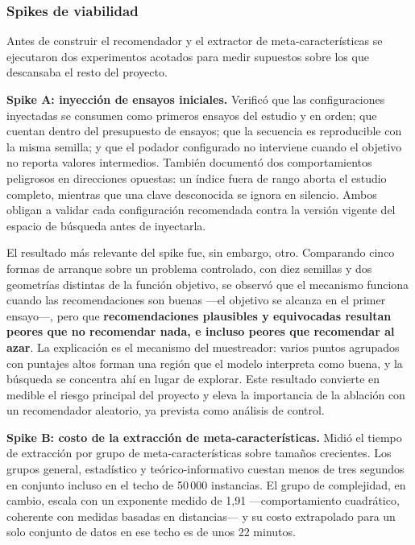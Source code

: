 \documentclass[12pt,letterpaper,oneside]{article}
\begin{document}
\subsubsection{Spikes de viabilidad}

Antes de construir el recomendador y el extractor de meta-características se ejecutaron dos
experimentos acotados para medir supuestos sobre los que descansaba el resto del proyecto.

\textbf{Spike A: inyección de ensayos iniciales.} Verificó que las configuraciones
inyectadas se consumen como primeros ensayos del estudio y en orden; que cuentan dentro del
presupuesto de ensayos; que la secuencia es reproducible con la misma semilla; y que el
podador configurado no interviene cuando el objetivo no reporta valores intermedios. También
documentó dos comportamientos peligrosos en direcciones opuestas: un índice fuera de rango
aborta el estudio completo, mientras que una clave desconocida se ignora en silencio. Ambos
obligan a validar cada configuración recomendada contra la versión vigente del espacio de
búsqueda antes de inyectarla.

El resultado más relevante del spike fue, sin embargo, otro. Comparando cinco formas de
arranque sobre un problema controlado, con diez semillas y dos geometrías distintas de la
función objetivo, se observó que el mecanismo funciona cuando las recomendaciones son
buenas —el objetivo se alcanza en el primer ensayo—, pero que \textbf{recomendaciones
plausibles y equivocadas resultan peores que no recomendar nada, e incluso peores que
recomendar al azar}. La explicación es el mecanismo del muestreador: varios puntos
agrupados con puntajes altos forman una región que el modelo interpreta como buena, y la
búsqueda se concentra ahí en lugar de explorar. Este resultado convierte en medible el
riesgo principal del proyecto y eleva la importancia de la ablación con un recomendador
aleatorio, ya prevista como análisis de control.

\textbf{Spike B: costo de la extracción de meta-características.} Midió el tiempo de
extracción por grupo de meta-características sobre tamaños crecientes. Los grupos general,
estadístico y teórico-informativo cuestan menos de tres segundos en conjunto incluso en el
techo de 50\,000 instancias. El grupo de complejidad, en cambio, escala con un exponente
medido de 1{,}91 —comportamiento cuadrático, coherente con medidas basadas en distancias— y
su costo extrapolado para un solo conjunto de datos en ese techo es de unos 22 minutos.
\end{document}
